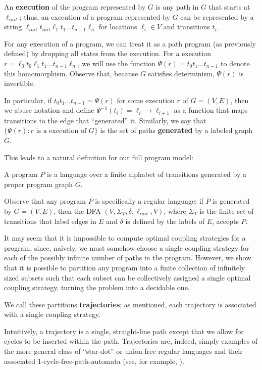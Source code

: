 An \textbf{execution} of the program represented by $G$ is any path in $G$ that starts at $\ell_{init}$; thus, an execution of a program represented by $G$ can be represented by a string $\ell_{init}t_{init}\ell_1t_1\ldots t_{n-1}\ell_n$ for locations $\ell_i\in V$ and transitions $t_i$.

For any execution of a program, we can treat it as a path program (as previously defined) by dropping all states from the execution. For a execution $r=\ell_0t_0\ell_1t_1\ldots t_{n-1}\ell_n$, we will use the function $\Psi(r) = t_0t_1\ldots t_{n-1}$ to denote this homomorphism. Observe that, because $G$ satisfies determinism, $\Psi(r)$ is invertible. 

In particular, if $t_0t_1\ldots t_{n-1} = \Psi(r)$ for some execution $r$ of $G = (V, E)$, then we abuse notation and define $\Psi^{-1}(t_i) = \ell_i\to\ell_{i+1}$ as a function that maps transitions to the edge that ``generated'' it. Similarly, we say that $\{\Psi(r): r\text{ is a execution of }G\}$ is the set of paths \textbf{generated} by a labeled graph $G$. 

This leads to a natural definition for our full program model: 
\begin{defn}[Programs]
    A program $P$ is a language over a finite alphabet of transitions generated by a proper program graph $G$.
\end{defn}

Observe that any program $P$ is specifically a regular language: if $P$ is generated by $G = (V, E)$, then the DFA $(V, \Sigma_T, \delta, \ell_{init}, V)$, where $\Sigma_T$ is the finite set of transitions that label edges in $E$ and $\delta$ is defined by the labels of $E$, accepts $P$.

It may seem that it is impossible to compute optimal coupling strategies for a program, since, naively, we must somehow choose a single coupling strategy for each of the possibly infinite number of paths in the program. However, we show that it is possible to partition any program into a finite collection of infinitely sized subsets such that each subset can be collectively assigned a single optimal coupling strategy, turning the problem into a decidable one.

We call these partitions \textbf{trajectories}; as mentioned, each trajectory is associated with a single coupling strategy. 

Intuitively, a trajectory is a single, straight-line path except that we allow for cycles to be inserted within the path. Trajectories are, indeed, simply examples of the more general class of ``star-dot'' or union-free regular languages and their associated 1-cycle-free-path-automata (see, for example, \cite{nagy2006union}).

